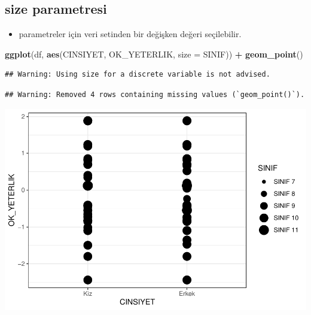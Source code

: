 \documentclass[
  oneside]{book}
\newenvironment{Shaded}{\begin{snugshade}}{\end{snugshade}}
\newcommand{\AttributeTok}[1]{\textcolor[rgb]{0.13,0.29,0.53}{#1}}
\newcommand{\FunctionTok}[1]{\textcolor[rgb]{0.13,0.29,0.53}{\textbf{#1}}}
\newcommand{\NormalTok}[1]{#1}
\newcommand{\SpecialCharTok}[1]{\textcolor[rgb]{0.81,0.36,0.00}{\textbf{#1}}}
\providecommand{\tightlist}{%
  \setlength{\itemsep}{0pt}\setlength{\parskip}{0pt}}
\begin{document}
\hypertarget{size-parametresi}{%
\subsection{\texorpdfstring{\textbf{size} parametresi}{size parametresi}}\label{size-parametresi}}

\begin{itemize}
\tightlist
\item
  parametreler için veri setinden bir değişken değeri seçilebilir.
\end{itemize}

\begin{Shaded}
\begin{Highlighting}[]
\FunctionTok{ggplot}\NormalTok{(df, }\FunctionTok{aes}\NormalTok{(CINSIYET, OK\_YETERLIK, }\AttributeTok{size =}\NormalTok{ SINIF)) }\SpecialCharTok{+}
  \FunctionTok{geom\_point}\NormalTok{()}
\end{Highlighting}
\end{Shaded}

\begin{verbatim}
## Warning: Using size for a discrete variable is not advised.
\end{verbatim}

\begin{verbatim}
## Warning: Removed 4 rows containing missing values (`geom_point()`).
\end{verbatim}

\begin{center}\includegraphics[width=1\linewidth]{15-betimleyici-istatistik_files/figure-latex/unnamed-chunk-45-1} \end{center}
\end{document}
